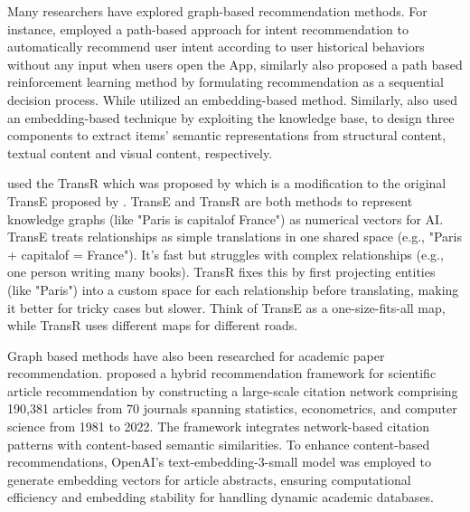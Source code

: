 \documentclass[a4paper,12pt]{article}
\begin{document}
Many researchers have explored graph-based recommendation methods. For instance,
\parencite{10.1145/3292500.3330673} employed a path-based approach for intent
recommendation to automatically recommend user intent according to user
historical behaviors without any input when users open the App,  similarly
\parencite{song2022ekarexplainablemethodknowledge} also proposed a path based
reinforcement learning method by formulating recommendation as a sequential
decision process. While \parencite{10.1145/3109859.3109889} utilized an embedding-based
method. Similarly, \parencite{10.1145/2939672.2939673} also used an embedding-based
technique by exploiting the knowledge base, to design three components to extract items'
semantic representations from structural content, textual content and visual content,
respectively.

\parencite{10.1145/2939672.2939673} used the TransR which was proposed by
\parencite{10.3233/JIFS-202177} which is a modification to the original TransE proposed
by \parencite{NIPS2013_1cecc7a7}.  TransE and TransR are both methods to represent
knowledge graphs (like "Paris is capitalof France") as numerical vectors for AI.
TransE treats relationships as simple translations in one shared space
(e.g., "Paris + capitalof = France"). It’s fast but struggles with complex
relationships (e.g., one person writing many books). TransR fixes this by first
projecting entities (like "Paris") into a custom space for each relationship before
translating, making it better for tricky cases but slower. Think of TransE as a
one-size-fits-all map, while TransR uses different maps for different roads.

Graph based methods have also been researched for academic paper recommendation.
\parencite{liu2025academicliteraturerecommendationlargescale} proposed a hybrid
recommendation framework for scientific article recommendation by constructing a
large-scale citation network comprising 190,381 articles from 70 journals spanning
statistics, econometrics, and computer science from 1981 to 2022. The framework
integrates network-based citation patterns with content-based semantic similarities.
To enhance content-based recommendations, OpenAI’s text-embedding-3-small model was
employed to generate embedding vectors for article abstracts, ensuring computational
efficiency and embedding stability for handling dynamic academic databases.
\end{document}

